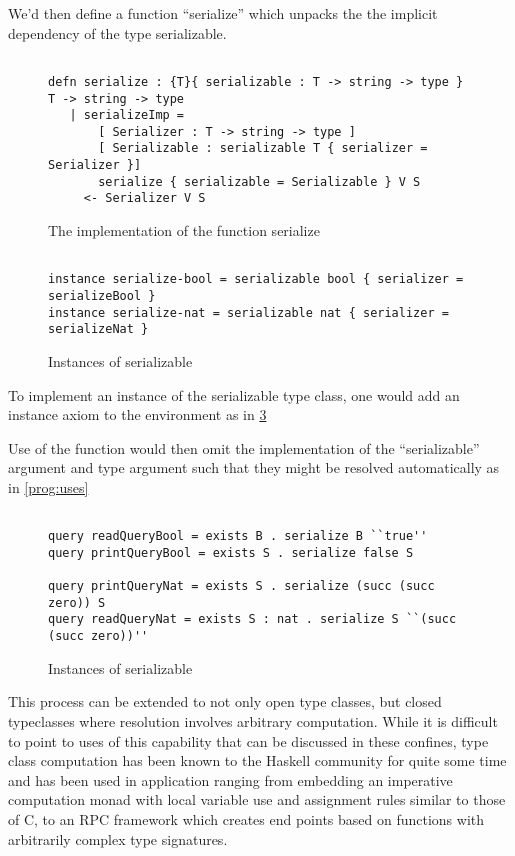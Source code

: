 We'd then define a function ``serialize'' which unpacks the the implicit dependency of the type serializable.


\begin{figure}[H]
\begin{lstlisting}

defn serialize : {T}{ serializable : T -> string -> type } T -> string -> type
   | serializeImp = 
       [ Serializer : T -> string -> type ]
       [ Serializable : serializable T { serializer = Serializer }]
       serialize { serializable = Serializable } V S
     <- Serializer V S

\end{lstlisting}
\caption{The implementation of the function serialize }
\label{prog:imp}
\end{figure}


\begin{figure}[H]
\begin{lstlisting}

instance serialize-bool = serializable bool { serializer = serializeBool }
instance serialize-nat = serializable nat { serializer = serializeNat }

\end{lstlisting}
\caption{ Instances of serializable }
\label{prog:inst}
\end{figure}


To implement an instance of the serializable type class, one would add an instance axiom to the environment as in \ref{prog:inst}

Use of the function would then omit the implementation of the ``serializable'' argument and type argument such that they might be resolved automatically as in \ref{prog:uses}


\begin{figure}[H]
\begin{lstlisting}

query readQueryBool = exists B . serialize B ``true''
query printQueryBool = exists S . serialize false S

query printQueryNat = exists S . serialize (succ (succ zero)) S
query readQueryNat = exists S : nat . serialize S ``(succ (succ zero))''

\end{lstlisting}
\caption{ Instances of serializable }
\label{prog:inst}
\end{figure}


This process can be extended to not only open type classes, but closed typeclasses where 
resolution involves arbitrary computation.  
While it is difficult to point to uses of this capability that can be discussed in these confines,
type class computation has been known to the Haskell community for quite some time and has been used in application ranging from embedding an imperative computation monad with local variable use and 
assignment rules similar to those of C, to an RPC framework which creates end points based on functions with arbitrarily complex type signatures.
